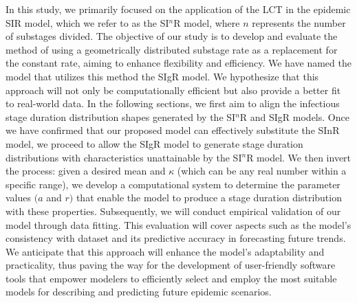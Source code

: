 \documentclass[12pt]{article}
\begin{document}
In this study, we primarily focused on the application of the LCT in the epidemic SIR model, which we refer to as the SI$^n$R model, where $n$ represents the number of substages divided. The objective of our study is to develop and evaluate the method of using a geometrically distributed substage rate as a replacement for the constant rate, aiming to enhance flexibility and efficiency. We have named the model that utilizes this method the SIgR model. We hypothesize that this approach will not only be computationally efficient but also provide a better fit to real-world data. In the following sections, we first aim to align the infectious stage duration distribution shapes generated by the SI$^n$R and SIgR models. Once we have confirmed that our proposed model can effectively substitute the SInR model, we proceed to allow the SIgR model to generate stage duration distributions with characteristics unattainable by the SI$^n$R model. We then invert the process: given a desired mean and $\kappa$ (which can be any real number within a specific range), we develop a computational system to determine the parameter values $(a$ and $r)$ that enable the model to produce a stage duration distribution with these properties. Subsequently, we will conduct empirical validation of our model through data fitting. This evaluation will cover aspects such as the model’s consistency with dataset and its predictive accuracy in forecasting future trends. We anticipate that this approach will enhance the model’s adaptability and practicality, thus paving the way for the development of user-friendly software tools that empower modelers to efficiently select and employ the most suitable models for describing and predicting future epidemic scenarios.
\end{document}
